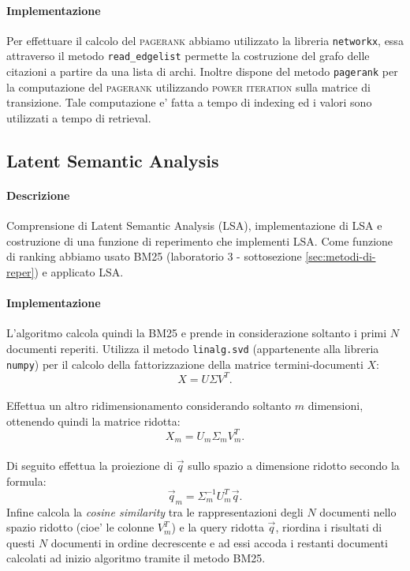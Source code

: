 \paragraph{\textbf{Implementazione}}
Per effettuare il calcolo del \textsc{pagerank} abbiamo utilizzato la libreria \texttt{networkx}, essa attraverso il metodo \texttt{read\_edgelist} permette la costruzione del grafo delle citazioni a partire da una lista di archi. Inoltre dispone del metodo \texttt{pagerank} per la computazione del \textsc{pagerank} utilizzando \textsc{power iteration} sulla matrice di transizione. Tale computazione e' fatta a tempo di indexing ed i valori sono utilizzati a tempo di retrieval.

\subsection{Latent Semantic Analysis}
\label{sec:lsa}

\paragraph{\textbf{Descrizione}}
Comprensione di Latent Semantic Analysis (\textsc{LSA}), implementazione di \textsc{LSA} e costruzione di una funzione di reperimento che implementi \textsc{LSA}.
Come funzione di ranking abbiamo usato \textsc{BM25} (laboratorio 3 - sottosezione \ref{sec:metodi-di-reper}) e applicato \textsc{LSA}. 


\paragraph{\textbf{Implementazione}} 
L'algoritmo calcola quindi la \textsc{BM25} e prende in considerazione soltanto i primi $N$ documenti reperiti. Utilizza il metodo \texttt{linalg.svd} (appartenente alla libreria \texttt{numpy}) per il calcolo della fattorizzazione della matrice termini-documenti $X$: 
\[ X = U \Sigma V^{T}. \]\\
Effettua un altro ridimensionamento considerando soltanto $m$ dimensioni, ottenendo quindi la matrice ridotta: \[ X_m = U_m \Sigma_m V^{T}_m. \]\\
Di seguito effettua la proiezione di $\vec{q}$ sullo spazio a dimensione ridotto secondo la formula: 
\[ \vec{q}_m = \Sigma^{-1}_m U^{T}_m \vec{q}. \]
Infine calcola la \textit{cosine similarity} tra le rappresentazioni degli $N$ documenti nello spazio ridotto (cioe' le colonne $V^{T}_m$) e la query ridotta $\vec{q}$, riordina i risultati di questi $N$ documenti in ordine decrescente e ad essi accoda i restanti documenti calcolati ad inizio algoritmo tramite il metodo \textsc{BM25}.


